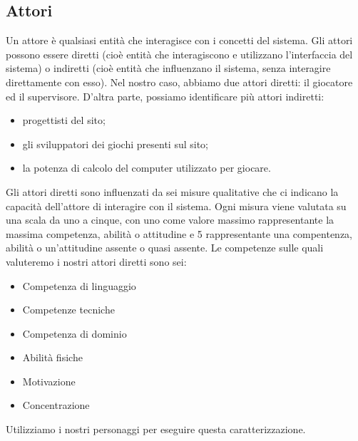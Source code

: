 \documentclass[../Report.tex]{subfiles}
\begin{document}
    \subsection{Attori}
    Un attore è qualsiasi entità che interagisce con i concetti del sistema. Gli attori possono essere diretti (cioè entità che interagiscono e utilizzano l'interfaccia del sistema) o indiretti (cioè entità che influenzano il sistema, senza interagire direttamente con esso). Nel nostro caso, abbiamo due attori diretti: il giocatore ed il supervisore. D'altra parte, possiamo identificare più attori indiretti:
    \begin{itemize}
        \item progettisti del sito;
        \item gli sviluppatori dei giochi presenti sul sito;
        \item la potenza di calcolo del computer utilizzato per giocare.
    \end{itemize}
    Gli attori diretti sono influenzati da sei misure qualitative che ci indicano la capacità dell'attore di interagire con il sistema. Ogni misura viene valutata su una scala da uno a cinque, con uno come valore massimo rappresentante la massima competenza, abilità o attitudine e 5 rappresentante una compentenza, abilità o un'attitudine assente o quasi assente. 
    Le competenze sulle quali valuteremo i nostri attori diretti sono sei:
    \begin{itemize}
        \item Competenza di linguaggio 
        \item Competenze tecniche 
        \item Competenza di dominio
        \item Abilità fisiche 
        \item Motivazione 
        \item Concentrazione
    \end{itemize}
    Utilizziamo i nostri personaggi per eseguire questa caratterizzazione.
\end{document}
